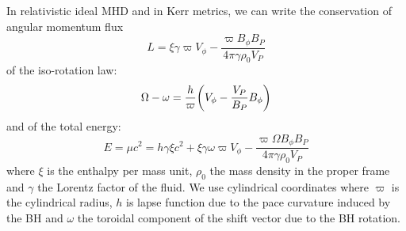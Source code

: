 \documentclass[10pt,a4paper,english]{article}
\let\originalleft\left
\let\originalright\right
\renewcommand{\left}{\mathopen{}\mathclose\bgroup\originalleft}
\renewcommand{\right}{\aftergroup\egroup\originalright}
\begin{document}
In relativistic ideal MHD and in Kerr metrics, we can write the conservation of
angular momentum flux
\begin{equation}
    L = \xi\gamma\varpi V_\phi - \frac{\varpi B_\phi B_P}{4\pi\gamma\rho_0 V_P}
\end{equation} of the iso-rotation law:
\begin{equation}
    \Omega - \omega = \frac{h}{\varpi}\left( V_\phi - \frac{V_P}{B_P}B_\phi \right)
\end{equation}
and of the total energy:
\begin{equation}
    E = \mu c^2 = h\gamma \xi c^2 + \xi \gamma \omega \varpi V_\phi - \frac{\varpi \Omega B_\phi B_P}{4\pi\gamma\rho_0 V_P}
\end{equation}
where $\xi$ is the enthalpy per mass unit, $\rho_0$ the mass density in the
proper frame and $\gamma$ the Lorentz factor of the fluid. We use cylindrical
coordinates where $\varpi$ is the cylindrical radius, $h$ is lapse function due
to the pace curvature induced by the BH and $\omega$ the toroidal component of
the shift vector due to the BH rotation.
\end{document}

